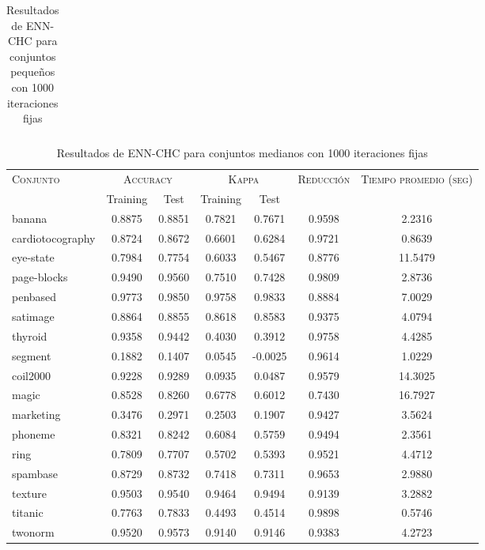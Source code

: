 \begin{table}[]
\begin{tabular}{l c c c c c c}
\hline
\end{tabular}
\caption{Resultados de ENN-CHC para conjuntos pequeños con 1000 iteraciones fijas}
\label{res-peq-ENN-CHC}
\end{table}


\begin{table}[]
\centering
\begin{tabular}{l c c c c c c}
\hline
\multirow{2}{*}{\textsc{Conjunto}}
	& \multicolumn{2}{c}{\textsc{Accuracy}}
	& \multicolumn{2}{c}{\textsc{Kappa}}
	& \textsc{Reducción}
	& \textsc{Tiempo promedio (seg)} \\
	& Training & Test
	& Training & Test \\ 
\hline
\hline

banana & 0.8875 & 0.8851 & 0.7821 & 0.7671 & 0.9598 & 2.2316 \\
cardiotocography & 0.8724 & 0.8672 & 0.6601 & 0.6284 & 0.9721 & 0.8639 \\
eye-state & 0.7984 & 0.7754 & 0.6033 & 0.5467 & 0.8776 & 11.5479 \\
page-blocks & 0.9490 & 0.9560 & 0.7510 & 0.7428 & 0.9809 & 2.8736 \\
penbased & 0.9773 & 0.9850 & 0.9758 & 0.9833 & 0.8884 & 7.0029 \\
satimage & 0.8864 & 0.8855 & 0.8618 & 0.8583 & 0.9375 & 4.0794 \\
thyroid & 0.9358 & 0.9442 & 0.4030 & 0.3912 & 0.9758 & 4.4285 \\
segment & 0.1882 & 0.1407 & 0.0545 & -0.0025 & 0.9614 & 1.0229 \\
coil2000 & 0.9228 & 0.9289 & 0.0935 & 0.0487 & 0.9579 & 14.3025 \\
magic & 0.8528 & 0.8260 & 0.6778 & 0.6012 & 0.7430 & 16.7927 \\
marketing & 0.3476 & 0.2971 & 0.2503 & 0.1907 & 0.9427 & 3.5624 \\
phoneme & 0.8321 & 0.8242 & 0.6084 & 0.5759 & 0.9494 & 2.3561 \\
ring & 0.7809 & 0.7707 & 0.5702 & 0.5393 & 0.9521 & 4.4712 \\
spambase & 0.8729 & 0.8732 & 0.7418 & 0.7311 & 0.9653 & 2.9880 \\
texture & 0.9503 & 0.9540 & 0.9464 & 0.9494 & 0.9139 & 3.2882 \\
titanic & 0.7763 & 0.7833 & 0.4493 & 0.4514 & 0.9898 & 0.5746 \\
twonorm & 0.9520 & 0.9573 & 0.9140 & 0.9146 & 0.9383 & 4.2723 \\

\hline
\end{tabular}
\caption{Resultados de ENN-CHC para conjuntos medianos con 1000 iteraciones fijas}
\label{res-med-ENN-CHC}
\end{table}



